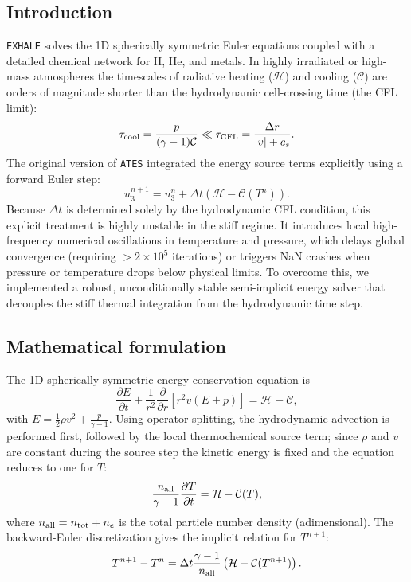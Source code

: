 \documentclass[english,a4paper]{my_memo}
\begin{document}
\subsection{Introduction}
\texttt{EXHALE} solves the 1D spherically symmetric Euler equations coupled
with a detailed chemical network for H, He, and metals. In highly irradiated or
high-mass atmospheres the timescales of radiative heating ($\mathcal{H}$) and
cooling ($\mathcal{C}$) are orders of magnitude shorter than the hydrodynamic
cell-crossing time (the CFL limit):
\begin{equation}
  \tau_{\rm cool} = \frac{p}{(\gamma - 1)\mathcal{C}} \ll \tau_{\rm CFL} = \frac{\Delta r}{|v| + c_s}.
\end{equation}
The original version of \texttt{ATES} integrated the energy source terms explicitly
using a forward Euler step:
\begin{equation}
  u^{n+1}_3 = u^n_3 + \Delta t \left( \mathcal{H} - \mathcal{C}(T^n) \right).
\end{equation}
Because $\Delta t$ is determined solely by the hydrodynamic CFL condition, this
explicit treatment is highly unstable in the stiff regime. It introduces local
high-frequency numerical oscillations in temperature and pressure, which delays
global convergence (requiring $>2\times 10^5$ iterations) or triggers NaN crashes
when pressure or temperature drops below physical limits. To overcome this, we
implemented a robust, unconditionally stable semi-implicit energy solver that
decouples the stiff thermal integration from the hydrodynamic time step.

\subsection{Mathematical formulation}
The 1D spherically symmetric energy conservation equation is
\begin{equation}
  \frac{\partial E}{\partial t} + \frac{1}{r^2} \frac{\partial}{\partial r} \left[ r^2 v (E + p) \right] = \mathcal{H} - \mathcal{C},
\end{equation}
with $E = \frac{1}{2}\rho v^2 + \frac{p}{\gamma-1}$. Using operator splitting, the
hydrodynamic advection is performed first, followed by the local thermochemical
source term; since $\rho$ and $v$ are constant during the source step the kinetic
energy is fixed and the equation reduces to one for $T$:
\begin{equation}
  \frac{n_{\rm all}}{\gamma - 1} \frac{\partial T}{\partial t} = \mathcal{H} - \mathcal{C}(T),
\end{equation}
where $n_{\rm all} = n_{\rm tot} + n_e$ is the total particle number density
(adimensional). The backward-Euler discretization gives the implicit relation for
$T^{n+1}$:
\begin{equation}
  T^{n+1} - T^n = \Delta t \frac{\gamma - 1}{n_{\rm all}} \left( \mathcal{H} - \mathcal{C}(T^{n+1}) \right).
\end{equation}
\end{document}
